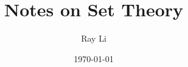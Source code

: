 \documentclass[10pt]{article}
\title{Notes on Set Theory}
\author{Ray Li}
\date{\today}
\begin{document}
\maketitle
\tableofcontents
\newpage\


% 








\end{document}

